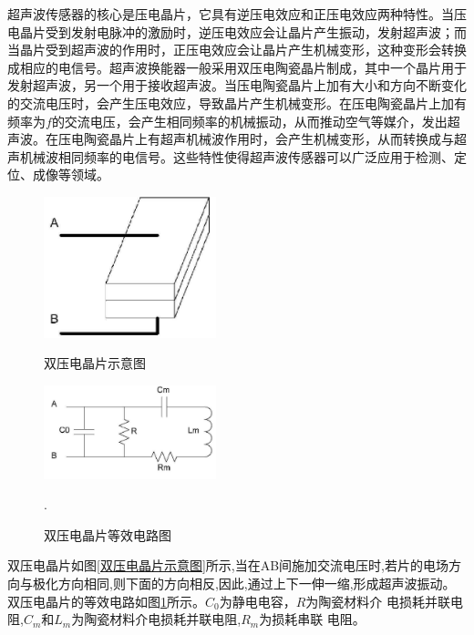     超声波传感器的核心是压电晶片，它具有逆压电效应和正压电效应两种特性。当压电晶片受到发射电脉冲的激励时，逆压电效应会让晶片产生振动，发射超声波；而当晶片受到超声波的作用时，正压电效应会让晶片产生机械变形，这种变形会转换成相应的电信号。超声波换能器一般采用双压电陶瓷晶片制成，其中一个晶片用于发射超声波，另一个用于接收超声波。当压电陶瓷晶片上加有大小和方向不断变化的交流电压时，会产生压电效应，导致晶片产生机械变形。在压电陶瓷晶片上加有频率为$f$的交流电压，会产生相同频率的机械振动，从而推动空气等媒介，发出超声波。在压电陶瓷晶片上有超声机械波作用时，会产生机械变形，从而转换成与超声机械波相同频率的电信号。这些特性使得超声波传感器可以广泛应用于检测、定位、成像等领域。\par
    \begin{figure}[!h]
   \centering
    	\begin{minipage}{0.4\textwidth}
    		\centering
    		\includegraphics[width=5cm]{figure/双压电晶片示意图.png}
    		\caption{双压电晶片示意图}
    		\label{双压电晶片示意图}
    	\end{minipage}
 
    \begin{minipage}{0.4\textwidth}
    	\centering
    	\includegraphics[width=5cm]{figure/双压电晶片等效电路.png}
    	\caption{双压电晶片等效电路图}
    	\label{双压电晶片等效电路图}.
    \end{minipage}
    	
 
    \end{figure}
    双压电晶片如图\ref{双压电晶片示意图}所示,当在AB间施加交流电压时,若片的电场方向与极化方向相同,则下面的方向相反,因此,通过上下一伸一缩,形成超声波振动。双压电晶片的等效电路如图\ref{双压电晶片等效电路图}所示。$C_0$为静电电容，$R$为陶瓷材料介 电损耗并联电阻,$C_m$和$L_m$为陶瓷材料介电损耗并联电阻,$R_m$为损耗串联 电阻。\par

